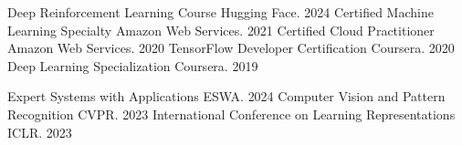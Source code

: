 


\begin{cvhonors}

    \cvhonor
    {Deep Reinforcement Learning Course} %
    {Hugging Face.} %
    {} %
    {2024} %
    \cvhonor
    {Certified Machine Learning Specialty} %
    {Amazon Web Services.} %
    {} %
    {2021} %
    \cvhonor
    {Certified Cloud Practitioner} %
    {Amazon Web Services.} %
    {} %
    {2020} %
    \cvhonor
    {TensorFlow Developer Certification} %
    {Coursera.} %
    {} %
    {2020} %
    \cvhonor
    {Deep Learning Specialization} %
    {Coursera.} %
    {} %
    {2019} %

\end{cvhonors}


\begin{cvhonors}
    \cvhonor
    {Expert Systems with Applications} %
    {ESWA.} %
    {} %
    {2024} %
    \cvhonor
    {Computer Vision and Pattern Recognition} %
    {CVPR.} %
    {} %
    {2023} %
    \cvhonor
    {International Conference on Learning Representations} %
    {ICLR.} %
    {} %
    {2023} %
\end{cvhonors}
